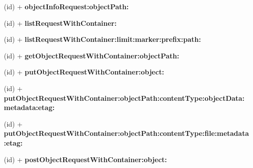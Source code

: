 \begin{DoxyCompactItemize}
\item 
\hypertarget{interface_a_s_i_cloud_files_object_request_a4b4f0ea695cdec431818f4ca24a8a1cf}{
(id) + {\bfseries object\-Info\-Request\-:object\-Path\-:}}
\label{interface_a_s_i_cloud_files_object_request_a4b4f0ea695cdec431818f4ca24a8a1cf}

\item 
\hypertarget{interface_a_s_i_cloud_files_object_request_ad140f7f65fef97218ff5a8853afbc0c7}{
(id) + {\bfseries list\-Request\-With\-Container\-:}}
\label{interface_a_s_i_cloud_files_object_request_ad140f7f65fef97218ff5a8853afbc0c7}

\item 
\hypertarget{interface_a_s_i_cloud_files_object_request_a67e5f2848052dcdf80aac2ffd4f64525}{
(id) + {\bfseries list\-Request\-With\-Container\-:limit\-:marker\-:prefix\-:path\-:}}
\label{interface_a_s_i_cloud_files_object_request_a67e5f2848052dcdf80aac2ffd4f64525}

\item 
\hypertarget{interface_a_s_i_cloud_files_object_request_ac41ac1686f40dd0b25f473b95de56a2b}{
(id) + {\bfseries get\-Object\-Request\-With\-Container\-:object\-Path\-:}}
\label{interface_a_s_i_cloud_files_object_request_ac41ac1686f40dd0b25f473b95de56a2b}

\item 
\hypertarget{interface_a_s_i_cloud_files_object_request_ac9c57b5595d42ea6fdb13b9baa5ad073}{
(id) + {\bfseries put\-Object\-Request\-With\-Container\-:object\-:}}
\label{interface_a_s_i_cloud_files_object_request_ac9c57b5595d42ea6fdb13b9baa5ad073}

\item 
\hypertarget{interface_a_s_i_cloud_files_object_request_a51fd51b32cb64756aa6fbc3f50ff7df4}{
(id) + {\bfseries put\-Object\-Request\-With\-Container\-:object\-Path\-:content\-Type\-:object\-Data\-:metadata\-:etag\-:}}
\label{interface_a_s_i_cloud_files_object_request_a51fd51b32cb64756aa6fbc3f50ff7df4}

\item 
\hypertarget{interface_a_s_i_cloud_files_object_request_a4fd2c82bc1702341d5a482f7ff46db4b}{
(id) + {\bfseries put\-Object\-Request\-With\-Container\-:object\-Path\-:content\-Type\-:file\-:metadata\-:etag\-:}}
\label{interface_a_s_i_cloud_files_object_request_a4fd2c82bc1702341d5a482f7ff46db4b}

\item 
\hypertarget{interface_a_s_i_cloud_files_object_request_ae713a0e0f7867895b33210be74770c47}{
(id) + {\bfseries post\-Object\-Request\-With\-Container\-:object\-:}}
\label{interface_a_s_i_cloud_files_object_request_ae713a0e0f7867895b33210be74770c47}


\end{DoxyCompactItemize}
